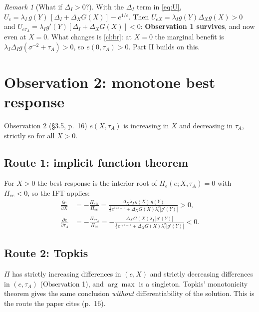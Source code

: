 \documentclass[11pt,a4paper]{article}
\theoremstyle{definition}
\theoremstyle{remark}
\newtheorem{remark}{Remark}
\newcommand{\tA}{\tau_A}
\newcommand{\lI}{\lambda_I}
\begin{document}
\begin{remark}[What if $\Delta_I>0$?]\label{rem:DI}
With the $\Delta_I$ term in \eqref{eq:U}, $U_e=\lI\,g(Y)\,[\Delta_I+\Delta_XG(X)]-e^{1/\varepsilon}$. Then
$U_{eX}=\lI g(Y)\Delta_Xg(X)>0$ and $U_{e\tA}=\lI g'(Y)[\Delta_I+\Delta_XG(X)]<0$: \textbf{Observation 1
survives}, and now even at $X=0$. What changes is \cref{cl:br}: at $X=0$ the marginal benefit is
$\lI\Delta_Ig(\sigma^{-2}+\tA)>0$, so $e(0,\tA)>0$. Part II builds on this.
\end{remark}

\section{Observation 2: monotone best response}

\begin{paperbox}{Observation 2 (\S3.5, p.~16)}
$e(X,\tA)$ is increasing in $X$ and decreasing in $\tA$, strictly so for all $X>0$.
\end{paperbox}

\subsection{Route 1: implicit function theorem}
For $X>0$ the best response is the interior root of $\Pi_e(e;X,\tA)=0$ with $\Pi_{ee}<0$, so the IFT applies:
\begin{align}
\frac{\partial e}{\partial X}&=-\frac{\Pi_{eX}}{\Pi_{ee}}
=\frac{\Delta_X\lI\,g(X)\,g(Y)}{\tfrac1\varepsilon e^{1/\varepsilon-1}+\Delta_XG(X)\lI^2|g'(Y)|}>0,\\[4pt]
\frac{\partial e}{\partial \tA}&=-\frac{\Pi_{e\tA}}{\Pi_{ee}}
=-\frac{\Delta_XG(X)\lI\,|g'(Y)|}{\tfrac1\varepsilon e^{1/\varepsilon-1}+\Delta_XG(X)\lI^2|g'(Y)|}<0.
\label{eq:detau}
\end{align}

\subsection{Route 2: Topkis}
$\Pi$ has strictly increasing differences in $(e,X)$ and strictly decreasing differences in $(e,\tA)$
(Observation 1), and $\arg\max$ is a singleton. Topkis' monotonicity theorem gives the same conclusion
\emph{without} differentiability of the solution. This is the route the paper cites (p.~16).
\end{document}
